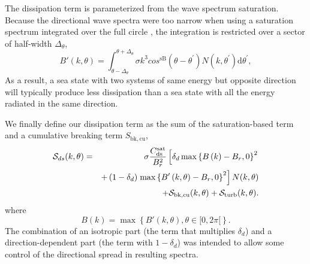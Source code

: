 The dissipation term is parameterized from the wave spectrum
saturation. Because the directional wave spectra were too narrow when using a
saturation spectrum integrated over the full circle \citep{art:AL06},
the integration is restricted over a sector of half-width $\Delta_\theta$,
\begin{equation}
B'\left(k,\theta\right)=
\int_{\theta-\Delta_\theta}^{\theta+\Delta_\theta} \sigma k^3 cos^{\mathrm{sB}}\left(\theta-
\theta^{\prime}\right) N(k,\theta^{\prime}) \mathrm d
\theta^{\prime} \label{defBofkprime},
\end{equation}
As a result, a sea state with two systems of same energy but opposite
direction will typically produce less dissipation than a sea state with all
the energy radiated in the same direction.

We finally define our dissipation term as the sum of the saturation-based term
and a cumulative breaking term $S_{\mathrm{bk,cu}}$,
\begin{eqnarray}
{\cal S}_{ds}(k,\theta)& =&  \sigma
 \frac{C_{\mathrm{ds}}^{\mathrm{sat}}}{B^2_r} \left[ \delta_d
\max\left\{ B\left(k\right) -
B_r,0\right\}^2 \right.
\nonumber \\
  & & +  \left(1-\delta_d \right) \left. \max\left\{B'\left(k,\theta \right)- B_r
 ,0\right\}^2\right]N(k,\theta)  \nonumber \\
 & & + {\cal S}_{\mathrm{bk,cu}}(k,\theta) + {\cal S}_{\mathrm{turb}}(k,\theta) \label{Sds_all}.
\end{eqnarray}
where
\begin{equation}
B\left(k \right)=\max\left\{B'(k,\theta), \theta \in [0,2
\pi[\right\} \label{defBof}.
\end{equation}
The combination of an isotropic part (the term that multiplies $ \delta_d$)
and a direction-dependent part (the term with $1-\delta_d$) was intended to
allow some control of the directional spread in resulting spectra.

